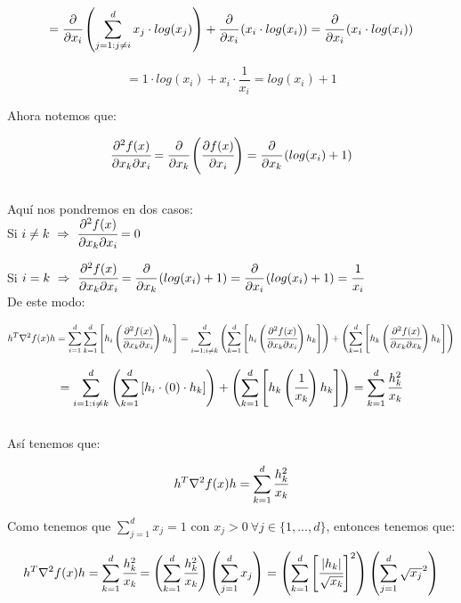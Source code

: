 \documentclass[11pt]{article}
\begin{document}
\[ = \cfrac{\partial }{\partial x_i} \left( \sum_{j=1: j \neq i}^{d} x_j \cdot log(x_j) \right) + \cfrac{\partial }{\partial x_i} \left( x_i \cdot log(x_i) \right) = \cfrac{\partial }{\partial x_i} \left( x_i \cdot log(x_i) \right) \]

\[ = 1 \cdot log(x_i) + x_i \cdot \frac{1}{x_i} = log(x_i) + 1 \]

Ahora notemos que:

\[ \cfrac{\partial^2 f(x)}{\partial x_k \partial x_i} = \cfrac{\partial}{\partial x_k} \left( \cfrac{\partial f(x)}{\partial x_i} \right) =  \cfrac{\partial}{\partial x_k} \left( log(x_i) + 1 \right) \] \\

Aquí nos pondremos en dos casos: \\

Si $ i \neq k \ \Rightarrow \  \cfrac{\partial^2 f(x)}{\partial x_k \partial x_i} = 0 $

Si $ i = k \ \Rightarrow \ \cfrac{\partial^2 f(x)}{\partial x_k \partial x_i} = \cfrac{\partial}{\partial x_k} \left( log(x_i) + 1 \right) = \cfrac{\partial}{\partial x_i} \left( log(x_i) + 1 \right) = \cfrac{1}{x_i} $ \\

De este modo:

\[ h^T \nabla^2 f(x) h = \sum_{i=1}^{d} \sum_{k=1}^{d} \left[ h_i \left( \cfrac{\partial^2 f(x)}{\partial x_k \partial x_i} \right) h_k \right] = \sum_{i=1: i \neq k }^{d} \left( \sum_{k=1}^{d} \left[ h_i \left( \cfrac{\partial^2 f(x)}{\partial x_k \partial x_i} \right) h_k \right] \right) + \left( \sum_{k=1}^{d} \left[ h_k \left( \cfrac{\partial^2 f(x)}{\partial x_k \partial x_k} \right) h_k \right] \right)   \]

\[ = \sum_{i=1: i \neq k }^{d} \left( \sum_{k=1}^{d} \left[ h_i \cdot \left( 0 \right) \cdot h_k \right] \right) + \left( \sum_{k=1}^{d} \left[ h_k \left( \cfrac{1}{x_k} \right) h_k \right] \right) = \sum_{k=1}^{d}  \cfrac{h_k^2}{x_k}    \] \\

Así tenemos que:

\[  h^T \nabla^2 f(x) h = \sum_{k=1}^{d}  \cfrac{h_k^2}{x_k} \]

Como tenemos que $ \sum_{j=1}^{d} x_j = 1 $ con $ x_j > 0 \ \forall j \in \lbrace 1,...,d \rbrace $, entonces tenemos que:

\[  h^T \nabla^2 f(x) h = \sum_{k=1}^{d}  \cfrac{h_k^2}{x_k} = \left( \sum_{k=1}^{d}  \cfrac{h_k^2}{x_k} \right) \left( \sum_{j=1}^{d} x_j  \right) = \left( \sum_{k=1}^{d}  \left[ \cfrac{|h_k|}{\sqrt{x_k}} \right]^2 \right) \left( \sum_{j=1}^{d} \sqrt{x_j}^2  \right) \]
\end{document}
